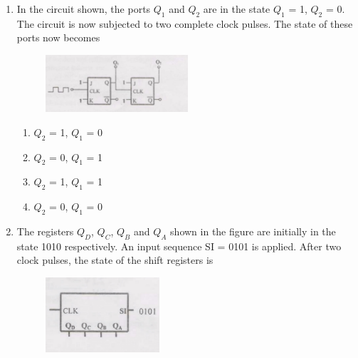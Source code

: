 \documentclass[journal,12pt,onecolumn]{IEEEtran}
\begin{document}
\begin{enumerate}[itemsep = 1em]
\begin{multicols}{4}
\begin{enumerate}
    \item F = Z
    \item F = Z + Y +YX
    \item ZY
    \item XYZ
\end{enumerate} 
\end{multicols}

\item In the circuit shown, the ports $Q_1$ and $Q_2$ are in the state $Q_1$ = 1, $Q_2$ = 0. The circuit is now subjected to two complete clock pulses. The state of these ports now becomes

\hfill{}

\begin{figure}[ht!]
    \centering
    \includegraphics[width=0.5\textwidth]{fig7.jpeg}
    \caption{}
    \label{fig:fig7.jpeg}
\end{figure}

\begin{multicols}{4}
\begin{enumerate}
    \item $Q_2$ = 1, $Q_1$ = 0
    \item $Q_2$ = 0, $Q_1$ = 1
    \item $Q_2$ = 1, $Q_1$ = 1
    \item $Q_2$ = 0, $Q_1$ = 0
\end{enumerate} 
\end{multicols}

\vspace{4em}

\item The registers $Q_D$, $Q_C$, $Q_B$ and $Q_A$ shown in the figure are initially in the state 1010 respectively. An input sequence SI = 0101 is applied. After two clock pulses, the state of the shift registers is

\hfill{}

\begin{figure}[ht!]
    \centering
    \includegraphics[width=0.4\textwidth]{fig8.jpeg}
    \caption{}
    \label{fig:fig8.jpeg}
\end{figure}


\end{enumerate}
\end{document}
